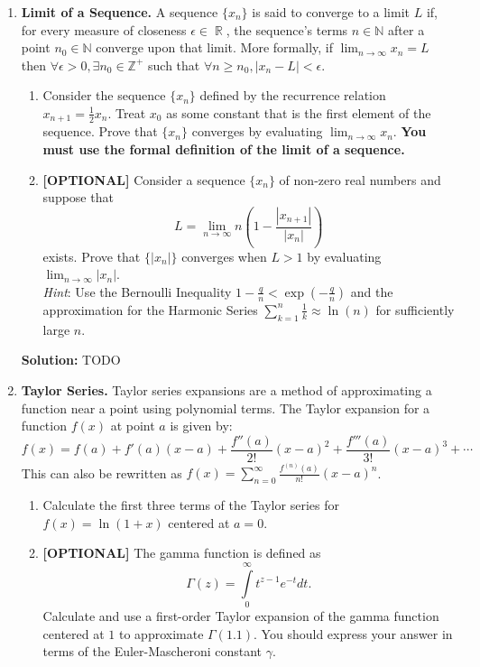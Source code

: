 \documentclass{article}
\DeclareMathOperator{\R}{\mathbb{R}}
\newenvironment{solution}{\color{blue} \smallskip \textbf{Solution:}}{}
\begin{document}
\begin{enumerate}

    \item 
    \textbf{Limit of a Sequence.} A sequence $\{x_n\}$ is said to converge to a limit $L$ if, for every measure of closeness $\epsilon \in \R$, the sequence's terms $n \in \mathbb{N}$ after a point $n_0 \in \mathbb{N}$ converge upon that limit. 
    More formally, if $\lim_{n \to \infty}x_n = L$ then $\forall \epsilon > 0, \exists n_0 \in \mathbb{Z}^+$ such that $\forall n \geq n_0, |x_n - L| < \epsilon$.
    \begin{enumerate}
        \item
        Consider the sequence $\{x_n\}$ defined by the recurrence relation $x_{n+1} = \frac{1}{2}x_n$. 
        Treat $x_0$ as some constant that is the first element of the sequence.
        Prove that $\{ x_n \}$ converges by evaluating $\lim_{n\to\infty} x_n$. 
        \textbf{You must use the formal definition of the limit of a sequence.}
        \item 
        \textbf{[OPTIONAL]} Consider a sequence $\{x_n\}$ of non-zero real numbers and suppose that 
        \[L = \lim_{n \to \infty} n\left(1 - \frac{|x_{n+1}|}{|x_n|}\right)\] 
        exists. 
        Prove that $\{ \vert x_n \vert \}$ converges when $L > 1$ by evaluating $\lim_{n\to \infty}|x_n|$. \\
        \emph{Hint}: Use the Bernoulli Inequality $1 - \frac{q}{n} < \exp(-\frac{q}{n})$ and the approximation for the Harmonic Series $\sum_{k=1}^n\frac{1}{k} \approx \ln(n)$ for sufficiently large $n$.
    \end{enumerate}

    \begin{solution}
        TODO
    \end{solution}

    \item
    \textbf{Taylor Series.} Taylor series expansions are a method of approximating a function near a point using polynomial terms. 
    The Taylor expansion for a function $f(x)$ at point $a$ is given by:
    \[
        f(x) = f(a) + f'(a)(x-a) + \frac{f''(a)}{2!}(x-a)^2 + \frac{f'''(a)}{3!}(x-a)^3 + \cdots
    \]
    This can also be rewritten as $f(x) = \sum_{n=0}^{\infty} \frac{f^{(n)}(a)}{n!} (x - a)^n$.
    \begin{enumerate}
        \item Calculate the first three terms of the Taylor series for $f(x)=\ln(1+x)$ centered at $a=0$.
        \item \textbf{[OPTIONAL]} The gamma function is defined as 
        \[
            \Gamma (z) = \int \limits_0^\infty t^{z-1} e^{-t} dt.
        \]
        Calculate and use a first-order Taylor expansion of the gamma function centered at $1$ to approximate $\Gamma(1.1)$. 
        You should express your answer in terms of the Euler-Mascheroni constant $\gamma$.


\end{enumerate}
\end{enumerate}
\end{document}
